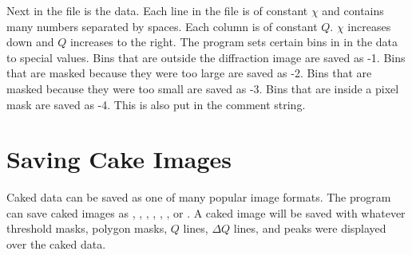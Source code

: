 Next in the file is the data. Each line in the file is of constant 
$\chi$ and contains many numbers separated by
spaces. Each column is of constant $Q$. $\chi$ increases down and 
$Q$ increases to the right. The program sets certain bins in 
in the data to special values. Bins that are outside the diffraction
image are saved as -1. Bins that are masked because they were too 
large are saved as -2. Bins that are masked because they were too 
small are saved as -3. Bins that are inside a pixel mask are saved 
as -4. This is also put in the comment string. 


\section{Saving Cake Images}

Caked data can be saved as one of many popular image formats.
The program can save caked images as , , , 
, , , or .  A caked image
will be saved with whatever threshold masks, polygon masks, $Q$ lines, 
$\Delta Q$ lines, and peaks were displayed over the caked data. 


